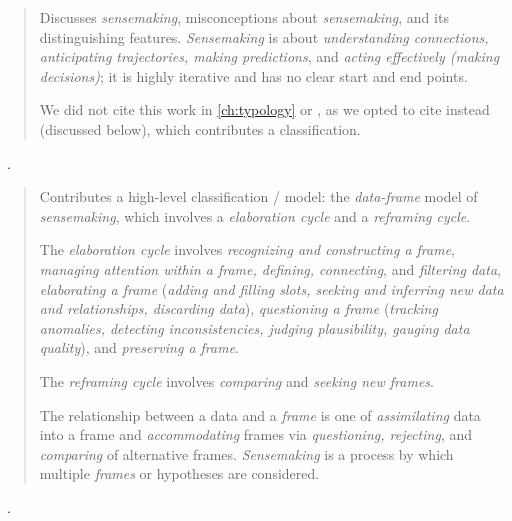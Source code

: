\begin{quotation}
    Discusses {\it sensemaking}, misconceptions about {\it sensemaking}, and its distinguishing features.
    {\it Sensemaking} is about {\it understanding connections, anticipating trajectories, making predictions}, and {\it acting effectively (\ie making decisions)}; it is highly iterative and has no clear start and end points.

    We did not cite this work in \autoref{ch:typology} or \citet{Brehmer2013}, as we opted to cite \citet{Klein2006} instead (discussed below), which contributes a classification.
\end{quotation}

\begin{sloppypar}
~\cite{Klein2006}. \end{sloppypar}

\begin{quotation}
    Contributes a high-level classification / model: the {\it data-frame} model of {\it sensemaking}, which involves a {\it elaboration cycle} and a {\it reframing cycle}.
    
    The {\it elaboration cycle} involves {\it recognizing and constructing a frame}, {\it managing attention within a frame, defining, connecting}, and {\it filtering data}, {\it elaborating a frame} ({\it adding and filling slots, seeking and inferring new data and relationships, discarding data}), {\it questioning a frame} ({\it tracking anomalies, detecting inconsistencies, judging plausibility, gauging data quality}), and {\it preserving a frame}.
    
   \begin{sloppypar}
   The {\it reframing cycle} involves {\it comparing} and {\it seeking new frames}.
   \end{sloppypar} 
    
    The relationship between a data and a {\it frame} is one of {\it assimilating} data into a frame and {\it accommodating} frames via {\it questioning, rejecting}, and {\it comparing} of alternative frames.
    {\it Sensemaking} is a process by which multiple {\it frames} or hypotheses are considered.
\end{quotation}

\begin{sloppypar}
~\cite{Lee2012}. \end{sloppypar}


